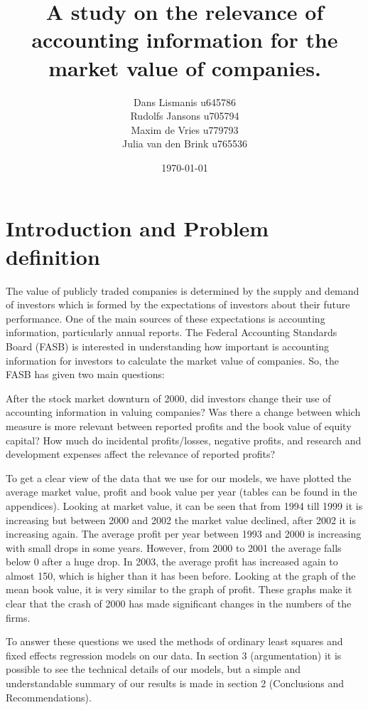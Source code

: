 \documentclass[11pt, letterpaper]{article}
\title{A study on the relevance of accounting information for the market value of companies.}
\author{Dans Lismanis u645786 \\ Rudolfs Jansons u705794\\ Maxim de Vries u779793\\ Julia van den Brink u765536 }
\date{\today}
\begin{document}
\maketitle
\newpage
\maketitle

\tableofcontents

\newpage
\section{Introduction and Problem definition}
The value of publicly traded companies is determined by the supply and demand of investors which is formed by the expectations of investors about their future performance. One of the main sources of these expectations is accounting information, particularly annual reports. The Federal Accounting Standards Board (FASB) is interested in understanding how important is accounting information for investors to calculate the market value of companies. So, the FASB has given two main questions:

After the stock market downturn of 2000, did investors change their use of accounting information in valuing companies? Was there a change between which measure is more relevant between reported profits and the book value of equity capital? How much do incidental profits/losses, negative profits, and research and development expenses affect the relevance of reported profits?

To get a clear view of the data that we use for our models, we have plotted the average market value, profit and book value per year (tables can be found in the appendices). Looking at market value, it can be seen that from 1994 till 1999 it is increasing but between 2000 and 2002 the market value declined, after 2002 it is increasing again. The average profit per year between 1993 and 2000 is increasing with small drops in some years. However, from 2000 to 2001 the average falls below 0 after a huge drop. In 2003, the average profit has increased again to almost 150, which is higher than it has been before. Looking at the graph of the mean book value, it is very similar to the graph of profit. These graphs make it clear that the crash of 2000 has made significant changes in the numbers of the firms.

To answer these questions we used the methods of ordinary least squares and fixed effects regression models on our data. In section 3 (argumentation) it is possible to see the technical details of our models, but a simple and understandable summary of our results is made in section 2 (Conclusions and Recommendations).
\end{document}
